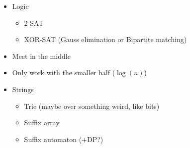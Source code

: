 \documentclass[9pt,a4paper,twocolumn,landscape,oneside]{amsart}
\newenvironment{myitemize}
{ \begin{itemize}[leftmargin=.5cm]
    \setlength{\itemsep}{0pt}
    \setlength{\parskip}{0pt}
    \setlength{\parsep}{0pt}     }
{ \end{itemize}                  }
\begin{document}
\begin{multicols*}{3}
\begin{myitemize}
\begin{itemize}
\begin{itemize}
                            \end{itemize}
                        \item Modular arithmetic
                            \begin{itemize}
                                \item Chinese Remainder Theorem
                                \item Linear Congruence
                            \end{itemize}
                        \item Sieve
                        \item System of linear equations
                        \item Values to big to represent?
                            \begin{itemize}
                                \item Compute using the logarithm
                                \item Divide everything by some large value
                            \end{itemize}
                        \item Linear programming
                            \begin{itemize}
                                \item Is the dual problem easier to solve?
                            \end{itemize}
                    \end{itemize}
                \item Logic
                    \begin{itemize}
                        \item 2-SAT
                        \item XOR-SAT (Gauss elimination or Bipartite matching)
                    \end{itemize}
                \item Meet in the middle
                \item Only work with the smaller half ($\log(n)$)
                \item Strings
                    \begin{itemize}
                        \item Trie (maybe over something weird, like bits)
                        \item Suffix array
                        \item Suffix automaton (+DP?)

\end{itemize}
\end{myitemize}
\end{multicols*}
\end{document}

